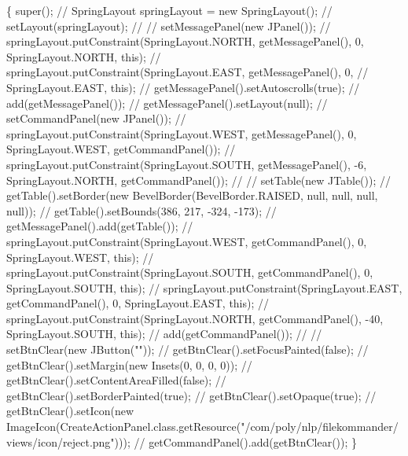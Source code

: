 \begin{DoxyCode}
                                        \{
        super();
\textcolor{comment}{//      SpringLayout springLayout = new SpringLayout();}
\textcolor{comment}{//      setLayout(springLayout);}
\textcolor{comment}{//}
\textcolor{comment}{//      setMessagePanel(new JPanel());}
\textcolor{comment}{//      springLayout.putConstraint(SpringLayout.NORTH, getMessagePanel(), 0,
       SpringLayout.NORTH, this);}
\textcolor{comment}{//      springLayout.putConstraint(SpringLayout.EAST, getMessagePanel(), 0,}
\textcolor{comment}{//              SpringLayout.EAST, this);}
\textcolor{comment}{//      getMessagePanel().setAutoscrolls(true);}
\textcolor{comment}{//      add(getMessagePanel());}
\textcolor{comment}{//      getMessagePanel().setLayout(null);}
\textcolor{comment}{//          setCommandPanel(new JPanel());}
\textcolor{comment}{//          springLayout.putConstraint(SpringLayout.WEST, getMessagePanel(), 0,
       SpringLayout.WEST, getCommandPanel());}
\textcolor{comment}{//          springLayout.putConstraint(SpringLayout.SOUTH, getMessagePanel(),
       -6, SpringLayout.NORTH, getCommandPanel());}
\textcolor{comment}{//              }
\textcolor{comment}{//              setTable(new JTable());}
\textcolor{comment}{//              getTable().setBorder(new BevelBorder(BevelBorder.RAISED, null,
       null, null, null));}
\textcolor{comment}{//              getTable().setBounds(386, 217, -324, -173);}
\textcolor{comment}{//              getMessagePanel().add(getTable());}
\textcolor{comment}{//              springLayout.putConstraint(SpringLayout.WEST,
       getCommandPanel(), 0, SpringLayout.WEST, this);}
\textcolor{comment}{//              springLayout.putConstraint(SpringLayout.SOUTH,
       getCommandPanel(), 0, SpringLayout.SOUTH, this);}
\textcolor{comment}{//              springLayout.putConstraint(SpringLayout.EAST,
       getCommandPanel(), 0, SpringLayout.EAST, this);}
\textcolor{comment}{//              springLayout.putConstraint(SpringLayout.NORTH,
       getCommandPanel(), -40, SpringLayout.SOUTH, this);}
\textcolor{comment}{//              add(getCommandPanel());}
\textcolor{comment}{//              }
\textcolor{comment}{//              setBtnClear(new JButton(""));}
\textcolor{comment}{//              getBtnClear().setFocusPainted(false);}
\textcolor{comment}{//              getBtnClear().setMargin(new Insets(0, 0, 0, 0));}
\textcolor{comment}{//              getBtnClear().setContentAreaFilled(false);}
\textcolor{comment}{//              getBtnClear().setBorderPainted(true);}
\textcolor{comment}{//              getBtnClear().setOpaque(true);}
\textcolor{comment}{//              getBtnClear().setIcon(new
       ImageIcon(CreateActionPanel.class.getResource("/com/poly/nlp/filekommander/views/icon/reject.png")));}
\textcolor{comment}{//              getCommandPanel().add(getBtnClear());}
    \}
\end{DoxyCode}


